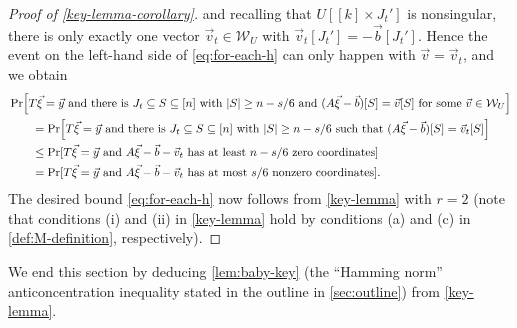 \documentclass[english]{article}
\theoremstyle{remark}
\numberwithin{equation}{section}
\numberwithin{figure}{section}
\newcommand{\su}{\subseteq}
\begin{document}
\begin{proof}[Proof of \cref{key-lemma-corollary}]
and recalling that $U[[k]\times J_{t}']$ is nonsingular, there is only
exactly one vector $\vec{v}_{t}\in\mathcal{W}_{U}$ with $\vec{v}_{t}[J_{t}']=-\vec{b}[J_{t}']$. Hence the event on the left-hand side of \cref{eq:for-each-h} can only happen with $\vec{v}=\vec{v}_{t}$, and we obtain
\begin{align*}
&\Pr\Bigl[T\vec{\xi}=\vec{y}\text{ and there is }J_t\su S\subseteq[n]\text{ with }|S|\ge n-s/6\text{ and }(A\vec{\xi}-\vec{b})[S]=\vec{v}[S]\text{ for some }\vec{v}\in\mathcal{W}_{U}\Bigr]\\
 & \qquad=\Pr\Bigl[T\vec{\xi}=\vec{y}\text{ and there is }J_t\su S\subseteq[n]\text{ with }|S|\ge n-s/6\text{ such that }(A\vec{\xi}-\vec{b})[S]=\vec{v}_{t}[S]\Bigr]\\
 & \qquad\le \Pr[T\vec{\xi}=\vec{y}\text{ and }A\vec{\xi}-\vec{b}-\vec{v}_{t}\text{ has at least }n-s/6\text{ zero coordinates}]\\
 & \qquad=\Pr[T\vec{\xi}=\vec{y}\text{ and }A\vec{\xi}-\vec{b}-\vec{v}_{t}\text{ has at most }s/6\text{ nonzero coordinates}].
\end{align*}
The desired bound \cref{eq:for-each-h} now follows from \cref{key-lemma} with $r=2$ (note that conditions (i) and (ii) in \cref{key-lemma} hold by conditions (a) and (c) in \cref{def:M-definition}, respectively).
\end{proof}

We end this section by deducing \cref{lem:baby-key} (the ``Hamming norm'' anticoncentration inequality stated in the outline in \cref{sec:outline}) from \cref{key-lemma}.
\end{document}
